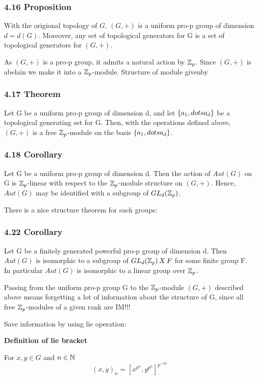 \subsubsection*{4.16 Proposition}
With the origional topology of $G,\,(G,+)$ is a uniform pro-p group of dimension $d=d(G)$. Moreover, any set of topological generators for G is a set of topological generators for $(G,+)$.

As $(G,+)$ is a pro-p group, it admits a natural action by $\mathbb Z_p$. Since $(G, +)$ is abelain we make it into a $\mathbb Z_p$-module. Structure of module givenby

\subsubsection*{4.17 Theorem}
Let G be a uniform pro-p group of dimension d, and let $\{a_1, \\dots a_d\}$ be a topological generating set for G. Then, with the operations defined above, $(G,+)$ is a free $\mathbb Z_p$-module on the basis $\{a_1, \\dots a_d\}$.

\subsubsection{4.18 Corollary}
Let G be a uniform pro-p group of dimension d. Then the action of $Aut(G)$ on G is $\mathbb Z_p$-linear with respect to the $\mathbb Z_p$-module structure on $(G,+)$. Hence, $Aut(G)$ may be identified with a subgroup of $GL_d(\mathbb Z_p)$.

There is a nice structure theorem for such groups:

\subsubsection*{4.22 Corollary}
Let G be a finitely generated powerful pro-p group of dimension d. Then $Aut(G)$ is isomorphic to a subgroup of $GL_d(\mathbb Z_p)\, X\, F$ for some finite group F. In particular $Aut(G)$ is isomorphic to a linear group over $\mathbb Z_p$.

Passing from the uniform pro-p group G to the $\mathbb Z_p$-module $(G,+)$ described above means forgetting a lot of information about the structure of G, since all free $\mathbb Z_p$-modules of a given rank are IM!!!

Save information by using lie operation:

\textbf{Definition of lie bracket}

For $x,y\in G$ and $n\in \mathbb N$
$$(x,y)_n = [x^{p^n} , y^{p^n}]^{p^{-2n}}$$

